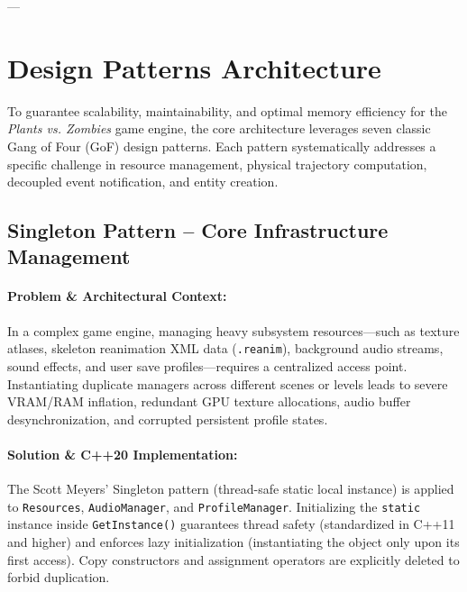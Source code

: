 \documentclass[12pt,a4paper]{article}
\begin{document}
---



\section{Design Patterns Architecture}
To guarantee scalability, maintainability, and optimal memory efficiency for the \textit{Plants vs. Zombies} game engine, the core architecture leverages seven classic Gang of Four (GoF) design patterns. Each pattern systematically addresses a specific challenge in resource management, physical trajectory computation, decoupled event notification, and entity creation.

\subsection{Singleton Pattern -- Core Infrastructure Management}

\paragraph{Problem \& Architectural Context:}
In a complex game engine, managing heavy subsystem resources—such as texture atlases, skeleton reanimation XML data (\texttt{.reanim}), background audio streams, sound effects, and user save profiles—requires a centralized access point. Instantiating duplicate managers across different scenes or levels leads to severe VRAM/RAM inflation, redundant GPU texture allocations, audio buffer desynchronization, and corrupted persistent profile states.

\paragraph{Solution \& C++20 Implementation:}
The Scott Meyers' Singleton pattern (thread-safe static local instance) is applied to \texttt{Resources}, \texttt{AudioManager}, and \texttt{ProfileManager}. Initializing the \texttt{static} instance inside \texttt{GetInstance()} guarantees thread safety (standardized in C++11 and higher) and enforces lazy initialization (instantiating the object only upon its first access). Copy constructors and assignment operators are explicitly deleted to forbid duplication.
\end{document}
